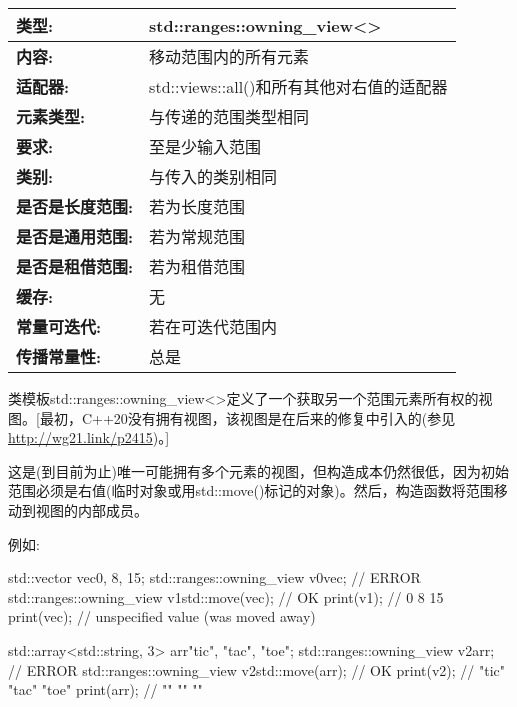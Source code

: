 \begin{longtable}[c]{|l|l|}
\hline
\textbf{类型:}                 & std::ranges::owning\_view\textless{}\textgreater{}  \\ \hline
\endfirsthead
%
\endhead
%
\textbf{内容:}              & 移动范围内的所有元素                       \\ \hline
\textbf{适配器:}             & std::views::all()和所有其他对右值的适配器 \\ \hline
\textbf{元素类型:}         & 与传递的范围类型相同                           \\ \hline
\textbf{要求:}             & 至是少输入范围                                \\ \hline
\textbf{类别:}             & 与传入的类别相同                                      \\ \hline
\textbf{是否是长度范围:}       & 若为长度范围                                  \\ \hline
\textbf{是否是通用范围:}      & 若为常规范围                                   \\ \hline
\textbf{是否是租借范围:}    & 若为租借范围                                \\ \hline
\textbf{缓存:}               & 无                                             \\ \hline
\textbf{常量可迭代:}       & 若在可迭代范围内                          \\ \hline
\textbf{传播常量性:} & 总是                                              \\ \hline
\end{longtable}

类模板std::ranges::owning\_view<>定义了一个获取另一个范围元素所有权的视图。[最初，C++20没有拥有视图，该视图是在后来的修复中引入的(参见\url{http://wg21.link/p2415})。]

这是(到目前为止)唯一可能拥有多个元素的视图，但构造成本仍然很低，因为初始范围必须是右值(临时对象或用std::move()标记的对象)。然后，构造函数将范围移动到视图的内部成员。

例如:

\begin{cpp}
std::vector vec{0, 8, 15};
std::ranges::owning_view v0{vec}; // ERROR
std::ranges::owning_view v1{std::move(vec)}; // OK
print(v1); // 0 8 15
print(vec); // unspecified value (was moved away)

std::array<std::string, 3> arr{"tic", "tac", "toe"};
std::ranges::owning_view v2{arr}; // ERROR
std::ranges::owning_view v2{std::move(arr)}; // OK
print(v2); // "tic" "tac" "toe"
print(arr); // "" "" ""
\end{cpp}

